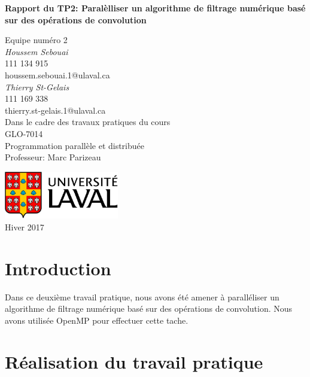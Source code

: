 \documentclass{report}
\begin{document}
\renewcommand{\labelitemi}{$\bullet$}
\renewcommand{\labelitemii}{$\circ$}
\thispagestyle{empty}

\begin{center}
	\vspace*{1cm}
	\huge  \bf Rapport du TP2: Paralèlliser un algorithme de filtrage numérique basé
	sur des opérations de convolution\\
	\vspace{1cm}

	\LARGE Equipe numéro 2\\
	\vspace{1.5cm}
	\normalsize
	\textit{Houssem Sebouai}\\
	111 134 915\\
	houssem.sebouai.1@ulaval.ca\\

  \vspace{1cm}
	\normalsize
	\textit{Thierry St-Gelais}\\
111 169 338\\
thierry.st-gelais.1@ulaval.ca\\

	\vspace{2cm}
	Dans le cadre des travaux pratiques du cours\\
	\LARGE GLO-7014\\
	\large Programmation parallèle et distribuée\\
	Professeur: Marc Parizeau

	\vfill
	\includegraphics[width=5cm]{Images/logo.jpg}
	\\
	Hiver 2017
\end{center}

\newpage

\tableofcontents
\listoffigures
\listoftables
\newpage
\chapter{Introduction}
Dans ce deuxième travail pratique, nous avons été amener à paralléliser un algorithme
de filtrage numérique basé sur des opérations de convolution. Nous avons utilisée OpenMP
pour effectuer cette tache.
\chapter{Réalisation du travail pratique}
\end{document}
